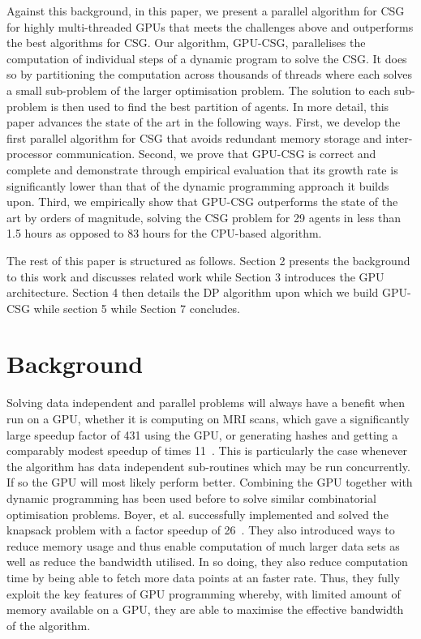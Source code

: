 \documentclass{llncs}
\begin{document}
Against this background, in this paper, we present a parallel algorithm for CSG for highly multi-threaded GPUs that meets the challenges above and outperforms the best algorithms for CSG. Our algorithm, GPU-CSG, parallelises the computation of individual steps of a dynamic program to solve the CSG. It does so by partitioning the computation across thousands of threads where each solves a small sub-problem of the larger optimisation problem. The solution to each sub-problem is then used to find the best partition of agents. In more detail, this paper advances the state of the art in the following ways. First, we develop the first parallel  algorithm for CSG that avoids redundant memory storage and inter-processor communication. Second, we prove that GPU-CSG is correct and complete and demonstrate through empirical evaluation that its growth rate is significantly lower than that of the dynamic programming approach it builds upon. Third, we empirically show that GPU-CSG outperforms the state of the art by orders of magnitude, solving the CSG problem for 29 agents in less than 1.5 hours as opposed to 83 hours for the CPU-based algorithm.

The rest of this paper is structured as follows. Section 2 presents the
background to this work and discusses related work while Section 3 introduces
the GPU architecture. Section 4 then details the DP algorithm upon which we build GPU-CSG
while section 5 while Section 7 concludes.

\section{Background}
Solving data independent and parallel problems will always have a benefit when run on a GPU, 
whether it is computing on MRI scans, which gave a significantly large speedup factor of 431 using the GPU, or generating hashes and getting a comparably modest speedup of times 11~\cite{ryoo2008optimization}.  This is particularly the case whenever the algorithm has data independent sub-routines which may be run concurrently. If so the GPU will most likely perform better. Combining the GPU together with dynamic programming has been used before to solve similar combinatorial optimisation problems.  Boyer, et al. successfully implemented and solved the knapsack problem with a factor speedup of 26~\cite{boyer2012solving}.  They also introduced ways to reduce memory usage and thus enable computation of much larger data sets as well as reduce the  bandwidth utilised. In so doing, they also reduce computation time by being able to fetch more data points at an faster rate. Thus, they fully exploit the key features of GPU programming whereby, with limited amount of memory available on a GPU,  they are able to maximise the effective bandwidth of the algorithm.
\end{document}
